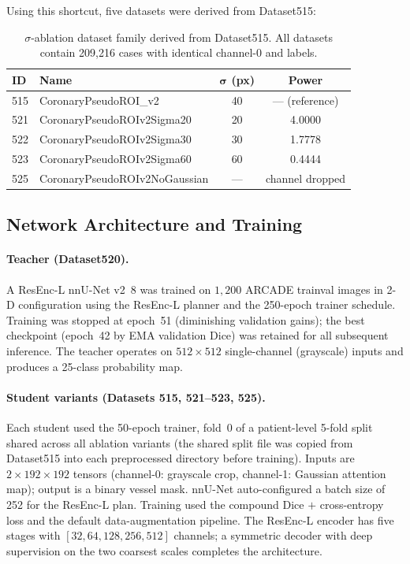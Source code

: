 \documentclass[12pt]{article}
\begin{document}
Using this shortcut, five datasets were derived from Dataset515:

\begin{table}[!htb]
\centering
\caption{$\sigma$-ablation dataset family derived from Dataset515.
All datasets contain 209{,}216 cases with identical channel-0 and labels.}
\label{tab:datasets}
\begin{tabular}{llcc}
\toprule
\textbf{ID} & \textbf{Name} & $\boldsymbol{\sigma}$ (px) & \textbf{Power} \\
\midrule
515 & CoronaryPseudoROI\_v2          & 40    & --- (reference) \\
521 & CoronaryPseudoROIv2Sigma20     & 20    & 4.0000 \\
522 & CoronaryPseudoROIv2Sigma30     & 30    & 1.7778 \\
523 & CoronaryPseudoROIv2Sigma60     & 60    & 0.4444 \\
525 & CoronaryPseudoROIv2NoGaussian  & ---   & channel dropped \\
\bottomrule
\end{tabular}
\end{table}

\subsection{Network Architecture and Training}
\label{sec:teacher}

\paragraph{Teacher (Dataset520).}
A ResEnc-L nnU-Net v2~8 was trained on $1{,}200$ ARCADE trainval images in
2-D configuration using the ResEnc-L planner and the 250-epoch trainer
schedule. Training was stopped at epoch~51 (diminishing validation gains);
the best checkpoint (epoch~42 by EMA validation Dice) was retained for all
subsequent inference. The teacher operates on $512\times512$ single-channel
(grayscale) inputs and produces a 25-class probability map.

\paragraph{Student variants (Datasets 515, 521--523, 525).}
Each student used the 50-epoch trainer, fold~0 of a patient-level 5-fold
split shared across all ablation variants (the shared split file was copied
from Dataset515 into each preprocessed directory before training).
Inputs are $2\times192\times192$ tensors (channel-0: grayscale crop,
channel-1: Gaussian attention map); output is a binary vessel mask.
nnU-Net auto-configured a batch size of 252 for the ResEnc-L plan.
Training used the compound Dice $+$ cross-entropy loss and the default
data-augmentation pipeline. The ResEnc-L encoder has five stages with
$[32, 64, 128, 256, 512]$ channels; a symmetric decoder with deep
supervision on the two coarsest scales completes the architecture.
\end{document}
